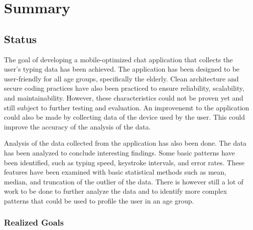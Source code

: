 \chapter{Summary}


\section{Status}


The goal of developing a mobile-optimized chat application that collects the user's typing data has been achieved.
The application has been designed to be user-friendly for all age groups, specifically the elderly.
Clean architecture and secure coding practices have also been practiced to ensure reliability, scalability, and maintainability.
However, these characteristics could not be proven yet and still subject to further testing and evaluation.
An improvenemt to the application could also be made by collecting data of the device used by the user.
This could improve the accuracy of the analysis of the data. 

Analysis of the data collected from the application has also been done.
The data has been analyzed to conclude interesting findings.
Some basic patterns have been identified, such as typing speed, keystroke intervals, and error rates.
These features have been examined with basic statistical methods such as mean, median, and truncation of the outlier of the data.
There is however still a lot of work to be done to further analyze the data and to identify more complex patterns that could be used to profile the user in an age group.

\subsection{Realized Goals}

